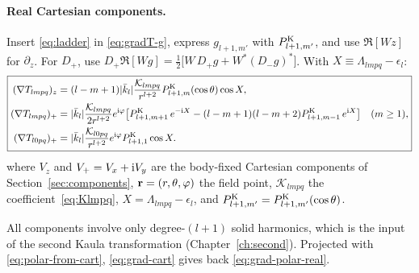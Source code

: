 \paragraph{Real Cartesian components.} Insert \eqref{eq:ladder} in \eqref{eq:gradT-g}, express $g_{l+1,m'}$ with $P^{\mathrm K}_{l+1,m'}$, and use $\Re[Wz]$ for $\partial_z$. For $D_+$, use $D_+\Re[Wg]=\tfrac12\big[W\,D_+g+W^*(D_-g)^*\big]$. With $X\equiv\Lambda_{lmpq}-\epsilon_l$:
\begin{equation}
  \boxed{\begin{aligned}
  (\nabla T_{lmpq})_z&=(l-m+1)|\bar k_l|\frac{\mathcal K_{lmpq}}{r^{l+2}}P^{\mathrm K}_{l+1,m}(\cos\theta)\cos X,\\
  (\nabla T_{lmpq})_+&=|\bar k_l|\frac{\mathcal K_{lmpq}}{2r^{l+2}}e^{\mathrm{i}\varphi}\big[P^{\mathrm K}_{l+1,m+1}\,e^{-\mathrm{i} X}-(l-m+1)(l-m+2)P^{\mathrm K}_{l+1,m-1}\,e^{\mathrm{i} X}\big]\quad(m\ge1),\\
  (\nabla T_{l0pq})_+&=|\bar k_l|\frac{\mathcal K_{l0pq}}{r^{l+2}}e^{\mathrm{i}\varphi}P^{\mathrm K}_{l+1,1}\cos X.
  \end{aligned}} \label{eq:grad-cart}
\end{equation}
where $V_z$ and $V_+=V_x+\mathrm{i} V_y$ are the body-fixed Cartesian components of Section~\ref{sec:components}, $\mathbf r=(r,\theta,\varphi)$ the field point, $\mathcal K_{lmpq}$ the coefficient~\eqref{eq:Klmpq}, $X=\Lambda_{lmpq}-\epsilon_l$, and $P^{\mathrm K}_{l+1,m'}=P^{\mathrm K}_{l+1,m'}(\cos\theta)$.

All components involve only degree-$(l+1)$ solid harmonics, which is the input of the second Kaula transformation (Chapter~\ref{ch:second}). Projected with \eqref{eq:polar-from-cart}, \eqref{eq:grad-cart} gives back \eqref{eq:grad-polar-real}.

